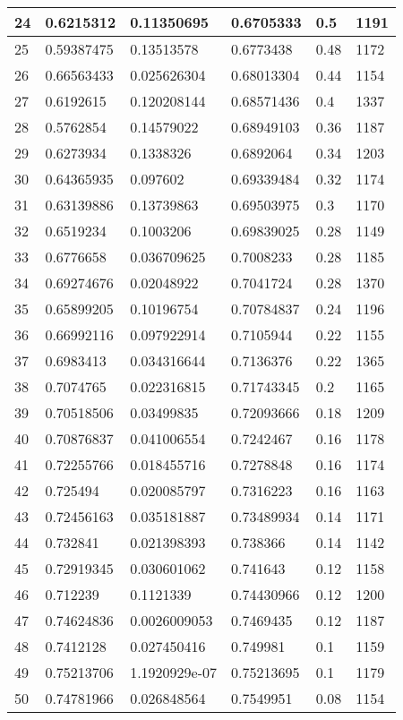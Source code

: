 \begin{longtable}{|l|l|l|l|l|l|}
24 & 0.6215312 & 0.11350695 & 0.6705333 & 0.5 & 1191 \\ \hline 
25 & 0.59387475 & 0.13513578 & 0.6773438 & 0.48 & 1172 \\ \hline 
26 & 0.66563433 & 0.025626304 & 0.68013304 & 0.44 & 1154 \\ \hline 
27 & 0.6192615 & 0.120208144 & 0.68571436 & 0.4 & 1337 \\ \hline 
28 & 0.5762854 & 0.14579022 & 0.68949103 & 0.36 & 1187 \\ \hline 
29 & 0.6273934 & 0.1338326 & 0.6892064 & 0.34 & 1203 \\ \hline 
30 & 0.64365935 & 0.097602 & 0.69339484 & 0.32 & 1174 \\ \hline 
31 & 0.63139886 & 0.13739863 & 0.69503975 & 0.3 & 1170 \\ \hline 
32 & 0.6519234 & 0.1003206 & 0.69839025 & 0.28 & 1149 \\ \hline 
33 & 0.6776658 & 0.036709625 & 0.7008233 & 0.28 & 1185 \\ \hline 
34 & 0.69274676 & 0.02048922 & 0.7041724 & 0.28 & 1370 \\ \hline 
35 & 0.65899205 & 0.10196754 & 0.70784837 & 0.24 & 1196 \\ \hline 
36 & 0.66992116 & 0.097922914 & 0.7105944 & 0.22 & 1155 \\ \hline 
37 & 0.6983413 & 0.034316644 & 0.7136376 & 0.22 & 1365 \\ \hline 
38 & 0.7074765 & 0.022316815 & 0.71743345 & 0.2 & 1165 \\ \hline 
39 & 0.70518506 & 0.03499835 & 0.72093666 & 0.18 & 1209 \\ \hline 
40 & 0.70876837 & 0.041006554 & 0.7242467 & 0.16 & 1178 \\ \hline 
41 & 0.72255766 & 0.018455716 & 0.7278848 & 0.16 & 1174 \\ \hline 
42 & 0.725494 & 0.020085797 & 0.7316223 & 0.16 & 1163 \\ \hline 
43 & 0.72456163 & 0.035181887 & 0.73489934 & 0.14 & 1171 \\ \hline 
44 & 0.732841 & 0.021398393 & 0.738366 & 0.14 & 1142 \\ \hline 
45 & 0.72919345 & 0.030601062 & 0.741643 & 0.12 & 1158 \\ \hline 
46 & 0.712239 & 0.1121339 & 0.74430966 & 0.12 & 1200 \\ \hline 
47 & 0.74624836 & 0.0026009053 & 0.7469435 & 0.12 & 1187 \\ \hline 
48 & 0.7412128 & 0.027450416 & 0.749981 & 0.1 & 1159 \\ \hline 
49 & 0.75213706 & 1.1920929e-07 & 0.75213695 & 0.1 & 1179 \\ \hline 
50 & 0.74781966 & 0.026848564 & 0.7549951 & 0.08 & 1154 \\ \hline 
\end{longtable}